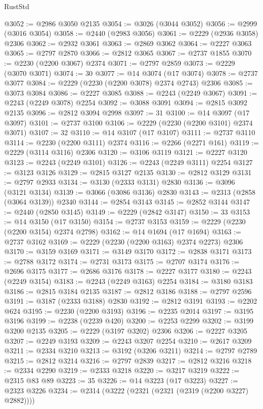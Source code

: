 \begin{lexlean}{RustStd}
\begin{coremodule}
{\begin{coremodule}
{{{{{{{{{{{{{{{{{{{{{{{{{{{{{{{{{{@3052 := @2986 @3050 @2135
@3054 := @3026 (@3044 @3052)
@3056 := @2999 (@3016 @3054)
@3058 := @2440 (@2983 @3056)
@3061 := @2229 (@2936 @3058) @2306
@3062 := @2932 @3061
@3063 := @2869 @3062
@3064 := @2227 @3063
@3065 := @2797 @2870
@3066 := @2812 @3065
@3067 := @2737 @1855
@3070 := @2230 (@2200 @3067) @2374
@3071 := @2797 @2859
@3073 := @2229 (@3070 @3071)
@3074 := 30
@3077 := @14 @3074 (@17 @3074)
@3078 := @2737 @3077
@3084 := @2229 (@2230 (@2200 @3078) @2374 @2743) @2306
@3085 := @3073 @3084
@3086 := @2227 @3085
@3088 := @2243 (@2249 @3067)
@3091 := @2243 (@2249 @3078) @2254
@3092 := @3088 @3091
@3094 := @2815 @3092 @2135
@3096 := @2812 @3094 @2998
@3097 := 31
@3100 := @14 @3097 (@17 @3097)
@3101 := @2737 @3100
@3106 := @2229 (@2230 (@2200 @3101) @2374 @3071)
@3107 := 32
@3110 := @14 @3107 (@17 @3107)
@3111 := @2737 @3110
@3114 := @2230 (@2200 @3111) @2374
@3116 := @2266 (@2271 @161)
@3119 := @2229 (@3114 @3116) @2306
@3120 := @3106 @3119
@3121 := @2227 @3120
@3123 := @2243 (@2249 @3101)
@3126 := @2243 (@2249 @3111) @2254
@3127 := @3123 @3126
@3129 := @2815 @3127 @2135
@3130 := @2812 @3129
@3131 := @2797 @2933
@3134 := @3130 (@2333 @3131) @2830
@3136 := @3096 (@3121 @3134)
@3139 := @3066 (@3086 @3136) @2830
@3143 := @2313 (@2858 (@3064 @3139)) @2340
@3144 := @2854 @3143
@3145 := @2852 @3144
@3147 := @2440 (@2850 @3145)
@3149 := @2229 (@2842 @3147)
@3150 := 33
@3153 := @14 @3150 (@17 @3150)
@3154 := @2737 @3153
@3159 := @2229 (@2230 (@2200 @3154) @2374 @2798)
@3162 := @14 @1694 (@17 @1694)
@3163 := @2737 @3162
@3169 := @2229 (@2230 (@2200 @3163) @2374 @2273) @2306
@3170 := @3159 @3169
@3171 := @3149 @3170
@3172 := @2838 @3171
@3173 := @2788 @3172
@3174 := @2731 @3173
@3175 := @2707 @3174
@3176 := @2696 @3175
@3177 := @2686 @3176
@3178 := @2227 @3177
@3180 := @2243 (@2249 @3154)
@3183 := @2243 (@2249 @3163) @2254
@3184 := @3180 @3183
@3186 := @2815 @3184 @2135
@3187 := @2812 @3186
@3188 := @2797 @2596
@3191 := @3187 (@2333 @3188) @2830
@3192 := @2812 @3191
@3193 := @2202 @624
@3195 := @2230 (@2200 @3193)
@3196 := @2235 @2014
@3197 := @3195 @3196
@3199 := @2238 (@2239 @420)
@3200 := @2253 @2299
@3202 := @3199 @3200 @2135
@3205 := @2229 (@3197 @3202) @2306
@3206 := @2227 @3205
@3207 := @2249 @3193
@3209 := @2243 @3207 @2254
@3210 := @2617 @3209
@3211 := @2334 @3210
@3213 := @3192 (@3206 @3211)
@3214 := @2797 @2789
@3215 := @2812 @3214
@3216 := @2797 @2839
@3217 := @2812 @3216
@3218 := @2334 @2290
@3219 := @2333 @3218
@3220 := @3217 @3219
@3222 := @2315 @83 @89
@3223 := 35
@3226 := @14 @3223 (@17 @3223)
@3227 := @2323 @3226
@3234 := @2314 (@3222 (@2321 (@2321 (@2319 (@2200 @3227) @2882))))
}}}}}}}}}}}}}}}}}}}}}}}}}}}}}}}}}}
\end{coremodule}}
\end{coremodule}
\end{lexlean}
